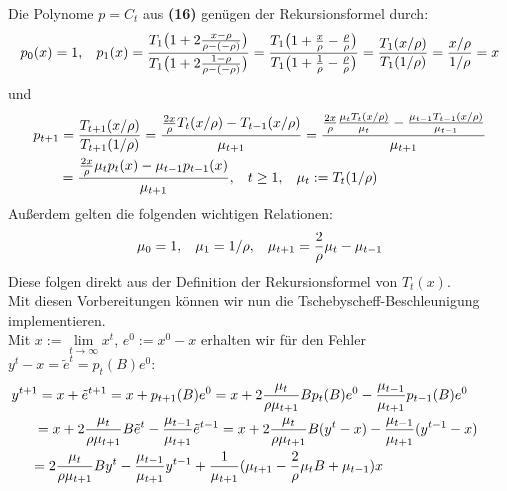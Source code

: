 \documentclass[12pt,a4paper,numbers=endperiod]{scrartcl}
\theoremstyle{definition}
\begin{document}
Die Polynome $p = C_t$ aus \textbf{(16)} genügen der Rekursionsformel durch: 
\begin{gather}
	p_0(x) = 1, \hspace{3mm} p_1(x) =\frac{T_1\big(1+ 2 \frac{x - \rho}{\rho - (-\rho)} \big)}{T_1\big(1 + 2 \frac{1-\rho}{\rho - (-\rho)}\big)} = \frac{T_1\big( 1+ \frac{x}{\rho} - \frac{\rho}{\rho}\big)}{T_1\big(1+ \frac{1}{\rho} - \frac{\rho}{\rho}\big)}  =  \frac{T_1(x/\rho)}{T_1(1/\rho)} = \frac{x/\rho}{1/\rho} = x
\end{gather}
und
\begin{equation}
\begin{gathered}
	p_{t+1} = \frac{T_{t+1}(x/\rho)}{T_{t+1}(1/\rho)} = \frac{\frac{2x}{\rho} T_t(x/\rho) - T_{t-1}(x/\rho)}{\mu_{t+1}} = \frac{\frac{2x}{\rho} \frac{\mu_t T_t(x/\rho)}{\mu_t} - \frac{\mu_{t-1}T_{t-1}(x/\rho)}{\mu_{t-1}}}{\mu_{t+1}}\\
	= \frac{\frac{2x}{\rho}\mu_t p_t(x) - \mu_{t-1}p_{t-1}(x)}{\mu_{t+1}}, \hspace{3mm} t \geq 1, \hspace{3mm} \mu_t := T_t(1/\rho) \hspace{20mm}
\end{gathered}
\end{equation}
Außerdem gelten die folgenden wichtigen Relationen:
\begin{gather}
	\mu_0 = 1, \hspace{3mm} \mu_1 = 1/\rho, \hspace{3mm} \mu_{t+1} = \frac{2}{\rho} \mu_t - \mu_{t-1}
\end{gather}
Diese folgen direkt aus der Definition der Rekursionsformel von $T_t(x)$.\\
Mit diesen Vorbereitungen können wir nun die Tschebyscheff-Beschleunigung implementieren.\\
Mit $x := \lim\limits_{t \rightarrow \infty} x^t$, $e^0 := x^0 -x$ erhalten wir für den Fehler $y^t -x = \tilde{e}^t = p_t(B)e^0:$
\begin{align*}
y^{t+1} = x + \tilde{e}^{t+1} = x + p_{t+1}(B)e^0 = x + 2 \frac{\mu_t}{\rho \mu_{t+1}}Bp_t(B)e^0 - \frac{\mu_{t-1}}{\mu_{t+1}} p_{t-1}(B)e^0 \hspace{10mm}\\
= x + 2 \frac{\mu_t}{\rho\mu_{t+1}}B \tilde{e}^t - \frac{\mu_{t-1}}{\mu_{t+1}} \tilde{e}^{t-1}
= x + 2 \frac{\mu_t}{\rho\mu_{t+1}} B (y^t -x) - \frac{\mu_{t-1}}{\mu_{t+1}}(y^{t-1} -x) \hspace{7.5mm} \\
= 2 \frac{\mu_t}{\rho \mu_{t+1}}By^t - \frac{\mu_{t-1}}{\mu_{t+1}} y^{t-1} + \frac{1}{\mu_{t+1}}(\mu_{t+1} - \frac{2}{\rho} \mu_tB + \mu_{t-1})x \hspace{31.3mm}
\end{align*}
\end{document}
